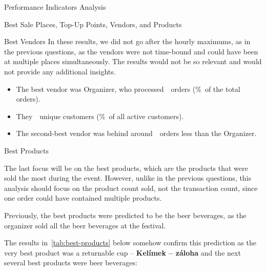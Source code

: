 \begin{section}{Performance Indicators Analysis}
\begin{subsection}{Best Sale Places, Top-Up Points, Vendors, and Products}
\begin{subsubsection}{Best Vendors}
			In these results, we did not go after the hourly maximums, as in the previous questions, as the vendors were not time-bound and could have been at multiple places simultaneously.
			The results would not be so relevant and would not provide any additional insights.

			\begin{keytakeaways}
				\begin{itemize}
					\item The best vendor was Organizer, who processed~~orders (\%~of the total orders).
					\item They~~unique customers (\%~of all active customers).
					\item The second-best vendor was behind around~~orders less than the Organizer.
				\end{itemize}
			\end{keytakeaways}
		\end{subsubsection}

		\begin{subsubsection}{Best Products}
			\label{subsubsec:analysis-best-products}

			The last focus will be on the best products, which are the products that were sold the most during the event.
			However, unlike in the previous questions, this analysis should focus on the product count sold, not the transaction count, since one order could have contained multiple products.


			Previously, the best products were predicted to be the beer beverages, as the organizer sold all the beer beverages at the festival.

			The results in~\autoref{tab:best-products} below somehow confirm this prediction as the very best product was a returnable cup – \textbf{Kelímek – záloha} and the next several best products were beer beverages:


\end{subsubsection}
\end{subsection}
\end{section}
